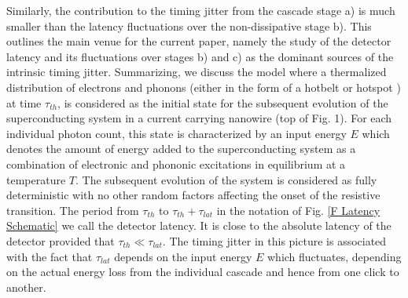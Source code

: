 \documentclass[%
reprint,
 amsmath,amssymb,
aps,
pra,
]{revtex4-1}
\begin{document}
Similarly, the contribution to the timing jitter from the cascade stage a) is much smaller than the latency fluctuations over the non-dissipative stage b).  This outlines the main venue for the current paper, namely the study of the detector latency and its fluctuations over stages b) and c) as the dominant sources of the intrinsic timing jitter.  Summarizing, we discuss the model where a thermalized distribution of electrons and phonons (either in the form of a hotbelt or hotspot \cite{vodolazov_single-photon_2017}) at time \(\tau_{th}\), is considered as the initial state for the subsequent evolution of the superconducting system in a current carrying nanowire (top of Fig. 1). For each individual photon count, this state is characterized by an input energy \(E\) which denotes the amount of energy added to the superconducting system as a combination of electronic and phononic excitations in equilibrium at a temperature \(T\).  The subsequent evolution of the system is considered as fully deterministic with no other random factors affecting the onset of the resistive transition.  The period from \(\tau_{th}\) to \(\tau_{th} + \tau_{lat}\) in the notation of Fig. \ref{F Latency Schematic} we call the detector latency.  It is close to the absolute latency of the detector provided that \(\tau_{th} \ll \tau_{lat}\).  The timing jitter in this picture is associated with the fact that \(\tau_{lat}\) depends on the input energy \(E\) which fluctuates, depending on the actual energy loss from the individual cascade and hence from one click to another.
\end{document}
